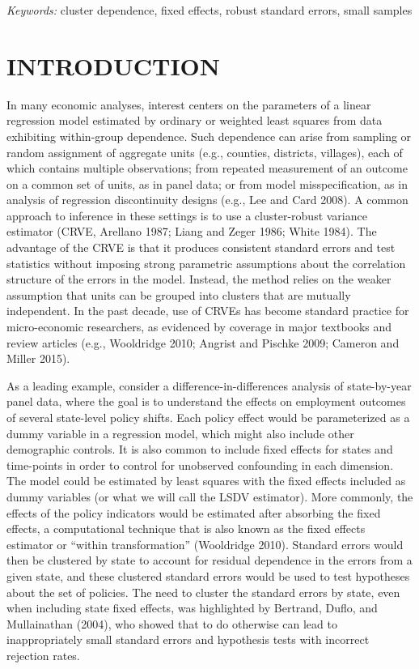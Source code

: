\documentclass[12pt]{article}
\begin{document}
\noindent%
{\it Keywords:} cluster dependence, fixed effects, robust standard
errors, small samples
\vfill

\newpage
{} %

\hypertarget{sec:intro}{%
\section{INTRODUCTION}\label{sec:intro}}

In many economic analyses, interest centers on the parameters of a
linear regression model estimated by ordinary or weighted least squares
from data exhibiting within-group dependence. Such dependence can arise
from sampling or random assignment of aggregate units (e.g., counties,
districts, villages), each of which contains multiple observations; from
repeated measurement of an outcome on a common set of units, as in panel
data; or from model misspecification, as in analysis of regression
discontinuity designs (e.g., Lee and Card 2008). A common approach to
inference in these settings is to use a cluster-robust variance
estimator (CRVE, Arellano 1987; Liang and Zeger 1986; White 1984). The
advantage of the CRVE is that it produces consistent standard errors and
test statistics without imposing strong parametric assumptions about the
correlation structure of the errors in the model. Instead, the method
relies on the weaker assumption that units can be grouped into clusters
that are mutually independent. In the past decade, use of CRVEs has
become standard practice for micro-economic researchers, as evidenced by
coverage in major textbooks and review articles (e.g., Wooldridge 2010;
Angrist and Pischke 2009; Cameron and Miller 2015).

As a leading example, consider a difference-in-differences analysis of
state-by-year panel data, where the goal is to understand the effects on
employment outcomes of several state-level policy shifts. Each policy
effect would be parameterized as a dummy variable in a regression model,
which might also include other demographic controls. It is also common
to include fixed effects for states and time-points in order to control
for unobserved confounding in each dimension. The model could be
estimated by least squares with the fixed effects included as dummy
variables (or what we will call the LSDV estimator). More commonly, the
effects of the policy indicators would be estimated after absorbing the
fixed effects, a computational technique that is also known as the fixed
effects estimator or ``within transformation'' (Wooldridge 2010).
Standard errors would then be clustered by state to account for residual
dependence in the errors from a given state, and these clustered
standard errors would be used to test hypotheses about the set of
policies. The need to cluster the standard errors by state, even when
including state fixed effects, was highlighted by Bertrand, Duflo, and
Mullainathan (2004), who showed that to do otherwise can lead to
inappropriately small standard errors and hypothesis tests with
incorrect rejection rates.
\end{document}
